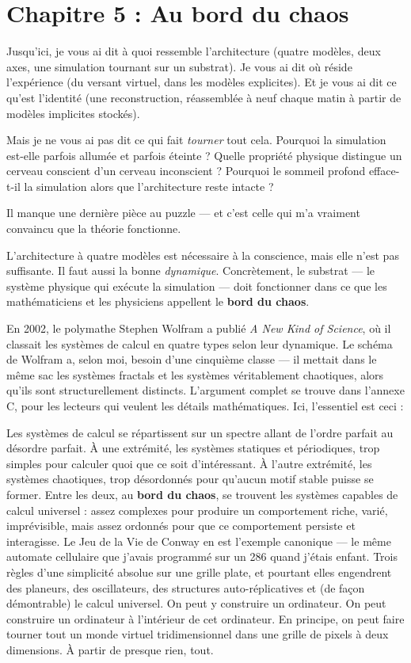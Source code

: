\documentclass[11pt, twoside, openright]{book}
\begin{document}
\chapter*{Chapitre 5 : Au bord du chaos}

Jusqu'ici, je vous ai dit à quoi ressemble l'architecture (quatre modèles, deux axes, une simulation tournant sur un substrat). Je vous ai dit où réside l'expérience (du versant virtuel, dans les modèles explicites). Et je vous ai dit ce qu'est l'identité (une reconstruction, réassemblée à neuf chaque matin à partir de modèles implicites stockés).

Mais je ne vous ai pas dit ce qui fait \textit{tourner} tout cela. Pourquoi la simulation est-elle parfois allumée et parfois éteinte ? Quelle propriété physique distingue un cerveau conscient d'un cerveau inconscient ? Pourquoi le sommeil profond efface-t-il la simulation alors que l'architecture reste intacte ?

Il manque une dernière pièce au puzzle --- et c'est celle qui m'a vraiment convaincu que la théorie fonctionne.

L'architecture à quatre modèles est nécessaire à la conscience, mais elle n'est pas suffisante. Il faut aussi la bonne \textit{dynamique}. Concrètement, le substrat --- le système physique qui exécute la simulation --- doit fonctionner dans ce que les mathématiciens et les physiciens appellent le \textbf{bord du chaos}.

En 2002, le polymathe Stephen Wolfram a publié \textit{A New Kind of Science}, où il classait les systèmes de calcul en quatre types selon leur dynamique. Le schéma de Wolfram a, selon moi, besoin d'une cinquième classe --- il mettait dans le même sac les systèmes fractals et les systèmes véritablement chaotiques, alors qu'ils sont structurellement distincts. L'argument complet se trouve dans l'annexe C, pour les lecteurs qui veulent les détails mathématiques. Ici, l'essentiel est ceci :

Les systèmes de calcul se répartissent sur un spectre allant de l'ordre parfait au désordre parfait. À une extrémité, les systèmes statiques et périodiques, trop simples pour calculer quoi que ce soit d'intéressant. À l'autre extrémité, les systèmes chaotiques, trop désordonnés pour qu'aucun motif stable puisse se former. Entre les deux, au \textbf{bord du chaos}, se trouvent les systèmes capables de calcul universel : assez complexes pour produire un comportement riche, varié, imprévisible, mais assez ordonnés pour que ce comportement persiste et interagisse. Le Jeu de la Vie de Conway en est l'exemple canonique --- le même automate cellulaire que j'avais programmé sur un 286 quand j'étais enfant. Trois règles d'une simplicité absolue sur une grille plate, et pourtant elles engendrent des planeurs, des oscillateurs, des structures auto-réplicatives et (de façon démontrable) le calcul universel. On peut y construire un ordinateur. On peut construire un ordinateur à l'intérieur de cet ordinateur. En principe, on peut faire tourner tout un monde virtuel tridimensionnel dans une grille de pixels à deux dimensions. À partir de presque rien, tout.
\end{document}
